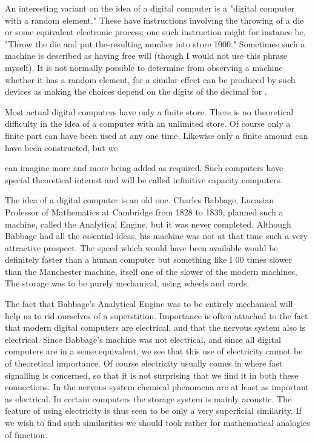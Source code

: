 \documentclass{article}
\begin{document}
An interesting variant on the idea of a digital computer is a "digital computer with a random element." These have instructions involving the throwing of a die or some equivalent electronic process; one such instruction might for instance be, "Throw the die and put the-resulting number into store 1000." Sometimes such a machine is described as having free will (though I would not use this phrase myself), It is not normally possible to determine from observing a machine whether it has a random element, for a similar effect can be produced by such devices as making the choices depend on the digits of the decimal for .

Most actual digital computers have only a finite store. There is no theoretical difficulty in the idea of a computer with an unlimited store. Of course only a finite part can have been used at any one time. Likewise only a finite amount can have been constructed, but we

can imagine more and more being added as required. Such computers have special theoretical interest and will be called infinitive capacity computers.

The idea of a digital computer is an old one. Charles Babbage, Lucasian Professor of Mathematics at Cambridge from 1828 to 1839, planned such a machine, called the Analytical Engine, but it was never completed. Although Babbage had all the essential ideas, his machine was not at that time such a very attractive prospect. The speed which would have been available would be definitely faster than a human computer but something like I 00 times slower than the Manchester machine, itself one of the slower of the modern machines, The storage was to be purely mechanical, using wheels and cards.

The fact that Babbage's Analytical Engine was to be entirely mechanical will help us to rid ourselves of a superstition. Importance is often attached to the fact that modern digital computers are electrical, and that the nervous system also is electrical. Since Babbage's machine was not electrical, and since all digital computers are in a sense equivalent, we see that this use of electricity cannot be of theoretical importance. Of course electricity usually comes in where fast signalling is concerned, so that it is not surprising that we find it in both these connections. In the nervous system chemical phenomena are at least as important as electrical. In certain computers the storage system is mainly acoustic. The feature of using electricity is thus seen to be only a very superficial similarity. If we wish to find such similarities we should took rather for mathematical analogies of function.
\end{document}
